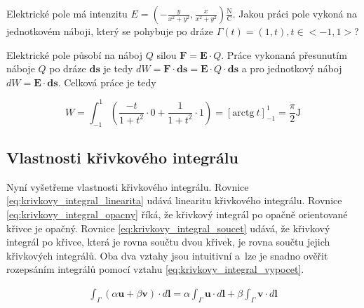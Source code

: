 \documentclass{book}
\newcommand{\vect}[1]{\boldsymbol{#1}}
\begin{document}
Elektrické pole má intenzitu \(E = \left(-\frac{y}{x^2+y^2}, \frac{x}{x^2+y^2}\right) \frac{\mathrm{N}}{\mathrm{C}}\). Jakou práci pole vykoná na jednotkovém náboji, který se pohybuje po dráze \(\Gamma(t) = (1, t), t \in <-1, 1>\)?




Elektrické pole působí na náboj \(Q\) silou \(\vect{F} = \vect{E} \cdot Q\). Práce vykonaná přesunutím náboje \(Q\) po dráze \(\vect{ds}\) je tedy \(dW = \vect{F} \cdot \vect{ds} = \vect{E} \cdot Q \cdot \vect{ds}\) a pro jednotkový náboj \(dW = \vect{E} \cdot \vect{ds}\). Celková práce je tedy

\[
W = \int_{-1}^1 \left (\frac{-t}{1 + t^2} \cdot 0 + \frac{1}{1 + t^2} \cdot 1 \right) = \left[\mathrm{arctg} \ t\right]_{-1}^1 = \frac{\pi}{2} \mathrm{J}
\]

\subsection{Vlastnosti křivkového integrálu}

Nyní vyšetřeme vlastnosti křivkového integrálu. Rovnice \eqref{eq:krivkovy_integral_linearita} udává linearitu křivkového integrálu. Rovnice \eqref{eq:krivkovy_integral_opacny} říká, že křivkový integrál po opačně orientované křivce je opačný. Rovnice \eqref{eq:krivkovy_integral_soucet} udává, že křivkový integrál po křivce, která je rovna součtu dvou křivek, je rovna součtu jejich křivkových integrálů. Oba dva vztahy jsou intuitivní a~lze je snadno ověřit rozepsáním integrálů pomocí vztahu \eqref{eq:krivkovy_integral_vypocet}.

\begin{equation}
\label{eq:krivkovy_integral_linearita}
\begin{split}
\int_{\Gamma} \left(\alpha \vect{u} + \beta \vect{v}\right) \cdot d\vect{l} = \alpha \int_{\Gamma} \vect{u} \cdot d\vect{l} + \beta \int_{\Gamma} \vect{v} \cdot d\vect{l}
\end{split}
\end{equation}
\end{document}
